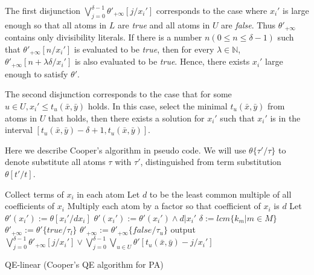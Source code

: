 \documentclass[runningheads]{llncs}
\newcommand\znj[1]{\textcolor{red}{#1}}
\begin{document}
The first disjunction $\bigvee_{j=0}^{\delta-1} \theta'_{+\infty}[j/x_i']$ corresponds to the case where $x_i'$ is large enough 
so that all atoms in $L$ are \textit{true} and all atoms in  $U$ are \textit{false}. Thus $\theta'_{+\infty}$  contains only divisibility literals.
If there is a number $n (0\le n \le \delta-1)$ such that $ \theta'_{+\infty}[n/x_i']$ is evaluated to be \textit{true},
then for every $\lambda\in \mathbb{N}$,
$\theta'_{+\infty}[n+\lambda\delta/x_i']$ is also evaluated to be \textit{true}.
Hence, there exists $x_i'$ large enough to satisfy $\theta'$.

The second disjunction corresponds to the case that for 
some $u\in U, x_i'\le t_u(\bar{x},\bar{y})$ holds.
In this case, 
select the minimal $t_u(\bar{x},\bar{y})$
from atoms in $U$ that holds,
then there exists a solution for $x_i'$ such that $x_i'$ is in the interval $[t_u(\bar{x},\bar{y})-\delta+1,t_u(\bar{x},\bar{y})]$.

Here we describe Cooper's algorithm in pseudo code.
We will use $\theta\{\tau'/\tau\}$ to denote substitute all atoms $\tau$ with $\tau'$,
distinguished from term substitution $\theta[t'/t]$.

\begin{algorithm}[t]
    \SetAlgoLined
    
    Collect terms of $x_i$ in each atom\;
    Let $d$ to be the least common multiple of all coefficients of $x_i$\;
    Multiply each atom by a factor so that coefficient of $x_i $ is $d$\;
    Let $\theta'(x_i'):= \theta[x_i'/dx_i]$\;
    $\theta'(x_i') := \theta'(x_i') \wedge d| x_i'$\;
    $\delta :=  lcm\{k_m|m\in M\}$\;
    {
        $\theta'_{+\infty}:=  \theta'\{\textit{true}/\tau_l\}$
    }
    {
        $\theta'_{+\infty}:=  \theta'_{+\infty}\{\textit{false}/\tau_u\}$
    }
    output $\bigvee_{j=0}^{\delta-1} \theta'_{+\infty}[j/x_i'] \vee \bigvee_{j=0}^{\delta-1} \bigvee_{u\in U}\theta'[t_u(\bar{x},\bar{y})-j/x_i']$
    \caption{QE-linear (Cooper's QE algorithm for PA)}
\end{algorithm}

\end{document}
